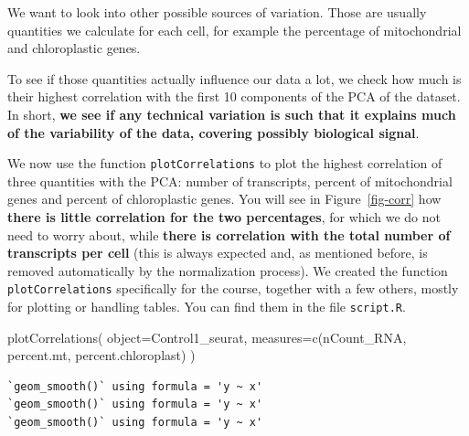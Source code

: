 \documentclass[
  letterpaper,
  DIV=11,
  numbers=noendperiod]{scrartcl}
\newenvironment{Shaded}{\begin{snugshade}}{\end{snugshade}}
\newcommand{\AttributeTok}[1]{\textcolor[rgb]{0.40,0.45,0.13}{#1}}
\newcommand{\FunctionTok}[1]{\textcolor[rgb]{0.28,0.35,0.67}{#1}}
\newcommand{\NormalTok}[1]{\textcolor[rgb]{0.00,0.23,0.31}{#1}}
\newcommand{\StringTok}[1]{\textcolor[rgb]{0.13,0.47,0.30}{#1}}
\begin{document}
We want to look into other possible sources of variation. Those are
usually quantities we calculate for each cell, for example the
percentage of mitochondrial and chloroplastic genes.

To see if those quantities actually influence our data a lot, we check
how much is their highest correlation with the first 10 components of
the PCA of the dataset. In short, \textbf{we see if any technical
variation is such that it explains much of the variability of the data,
covering possibly biological signal}.

We now use the function \texttt{plotCorrelations} to plot the highest
correlation of three quantities with the PCA: number of transcripts,
percent of mitochondrial genes and percent of chloroplastic genes. You
will see in Figure~\ref{fig-corr} how \textbf{there is little
correlation for the two percentages}, for which we do not need to worry
about, while \textbf{there is correlation with the total number of
transcripts per cell} (this is always expected and, as mentioned before,
is removed automatically by the normalization process). We created the
function \texttt{plotCorrelations} specifically for the course, together
with a few others, mostly for plotting or handling tables. You can find
them in the file \texttt{script.R}.

\begin{Shaded}
\begin{Highlighting}[]
\FunctionTok{plotCorrelations}\NormalTok{( }\AttributeTok{object=}\NormalTok{Control1\_seurat, }\AttributeTok{measures=}\FunctionTok{c}\NormalTok{(}\StringTok{\textquotesingle{}nCount\_RNA\textquotesingle{}}\NormalTok{, }\StringTok{\textquotesingle{}percent.mt\textquotesingle{}}\NormalTok{, }\StringTok{\textquotesingle{}percent.chloroplast\textquotesingle{}}\NormalTok{) )}
\end{Highlighting}
\end{Shaded}

\begin{verbatim}
`geom_smooth()` using formula = 'y ~ x'
`geom_smooth()` using formula = 'y ~ x'
`geom_smooth()` using formula = 'y ~ x'
\end{verbatim}
\end{document}
